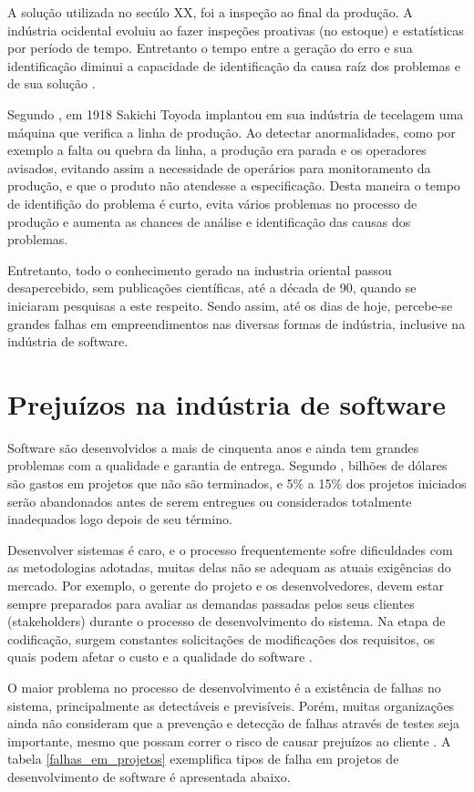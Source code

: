 A solução utilizada no secúlo XX, foi a inspeção ao final da produção. A indústria ocidental evoluiu ao fazer inspeções proativas (no estoque) e estatísticas por período de tempo. Entretanto o tempo entre a geração do erro e sua identificação diminui a capacidade de identificação da causa raíz dos problemas e de sua solução \cite{CARVALHO}.

Segundo , em 1918 Sakichi Toyoda implantou em sua indústria de tecelagem uma máquina que verifica a linha de produção. Ao detectar anormalidades, como por exemplo a falta ou quebra da linha, a produção era parada e os operadores avisados, evitando assim a necessidade de operários para monitoramento da produção, e que o produto não atendesse a especificação. Desta maneira o tempo de identifição do problema é curto, evita vários problemas no processo de produção e aumenta as chances de análise e identificação das causas dos problemas.

Entretanto, todo o conhecimento gerado na industria oriental passou desapercebido, sem publicações científicas, até a década de 90, quando se iniciaram pesquisas a este respeito. Sendo assim, até os dias de hoje, percebe-se grandes falhas em empreendimentos nas diversas formas de indústria, inclusive na indústria de software.

\section{Prejuízos na indústria de software}

Software são desenvolvidos a mais de cinquenta anos e ainda tem grandes problemas com a qualidade e garantia de entrega. Segundo , bilhões de dólares são gastos em projetos  que não são terminados, e 5\% a 15\% dos projetos iniciados serão abandonados antes de serem entregues ou considerados totalmente inadequados logo depois de seu término.

Desenvolver sistemas é caro, e o processo frequentemente sofre dificuldades com as metodologias adotadas, muitas delas não se adequam as atuais exigências do mercado. Por exemplo, o gerente do projeto e os desenvolvedores, devem estar sempre preparados para avaliar as demandas passadas pelos seus clientes (stakeholders) durante o processo de desenvolvimento do sistema. Na etapa de codificação, surgem constantes solicitações de modificações dos requisitos, os quais podem afetar o custo e a qualidade do software \cite{CERPA}.

O maior problema no processo de desenvolvimento é a existência de falhas no sistema, principalmente as detectáveis e previsíveis. Porém, muitas organizações ainda não consideram que a prevenção e detecção de falhas através de testes seja importante, mesmo que possam correr o risco de causar prejuízos ao cliente \cite{CHARETTE}. A tabela \ref{falhas_em_projetos} exemplifica tipos de falha em projetos de desenvolvimento de software é apresentada abaixo.

